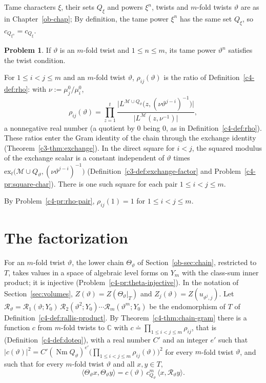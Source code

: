 \documentclass[reqno]{amsart}
\newcounter{chap}
\theoremstyle{definition}
\newtheorem{problem}{Problem}[section]
\theoremstyle{plain}
\newcommand{\C}{\mathbb C}
\newcommand{\Nm}{\operatorname{Nm}}
\newcommand{\Rc}{\mathcal R}
\begin{document}
Tame characters \(\xi\), their sets \(Q_\xi\) and powers \(\xi^n\), twists and \(m\)-fold twists \(\vartheta\) are as in Chapter~\ref{ob-chap}; By definition, the tame power \(\xi^n\) has the same set \(Q_\xi\), so \(c_{Q_{\xi^n}} = c_{Q_\xi}\).

\begin{problem}\label{pr:powers}
If \(\vartheta\) is an \(m\)-fold twist and \(1 \le n \le m\), its tame power \(\vartheta^n\) satisfies the twist condition.
\end{problem}

For \(1 \le i < j \le m\) and an \(m\)-fold twist \(\vartheta\), \(\rho_{ij}(\vartheta)\) is the ratio of Definition~\ref{c4-def:rho}: with \(\nu := \mu_j^0/\mu_i^0\),
\[
  \rho_{ij}(\vartheta) = \prod_{z=1}^{t} \frac{\lvert L^{\mathcal M \cup Q_\vartheta}\bigl(z, (\nu\vartheta^{j-i})^{-1}\bigr)\rvert}{\lvert L^{\mathcal M}(z, \nu^{-1})\rvert} ,
\]
a nonnegative real number (a quotient by \(0\) being \(0\), as in Definition~\ref{c4-def:rho}).  These ratios enter the Gram identity of the chain through the exchange identity (Theorem~\ref{c3-thm:exchange}).  In the direct square for \(i < j\), the squared modulus of the exchange scalar is a constant independent of \(\vartheta\) times \(\mathrm{ex}_t\bigl(\mathcal M \cup Q_\vartheta, (\nu\vartheta^{j-i})^{-1}\bigr)\) (Definition~\ref{c3-def:exchange-factor} and Problem~\ref{c4-pr:square-char}).  There is one such square for each pair \(1 \le i < j \le m\).

By Problem~\ref{c4-pr:rho-pair}, \(\rho_{ij}(1) = 1\) for \(1 \le i < j \le m\).

\section{The factorization}\label{sec:factor}

For an \(m\)-fold twist \(\vartheta\), the lower chain \(\Theta_\vartheta\) of Section~\ref{ob-sec:chain}, restricted to \(T\), takes values in a space of algebraic level forms on \(Y_m\) with the class-sum inner product; it is injective (Problem~\ref{c4-pr:theta-injective}).  In the notation of Section~\ref{sec:volumes}, \(Z(\vartheta) = Z(\Theta_\vartheta|_T)\) and \(Z_j(\vartheta) = Z(u_{\vartheta^j, j})\).  Let \(\Rc_\vartheta = \Rc_1(\vartheta; Y_0)\,\Rc_2(\vartheta^2; Y_0) \cdots \Rc_m(\vartheta^m; Y_0)\) be the endomorphism of \(T\) of Definition~\ref{c4-def:rallis-product}.  By Theorem~\ref{c4-thm:chain-gram} there is a function \(c\) from \(m\)-fold twists to \(\C\) with \(c \doteq \prod_{1 \le i < j \le m}\rho_{ij}\), that is (Definition~\ref{c4-def:doteq}), with a real number \(C'\) and an integer \(e'\) such that \(\lvert c(\vartheta)\rvert^2 = C'(\Nm Q_\vartheta)^{e'}\bigl(\prod_{1 \le i < j \le m}\rho_{ij}(\vartheta)\bigr)^2\) for every \(m\)-fold twist \(\vartheta\), and such that for every \(m\)-fold twist \(\vartheta\) and all \(x, y \in T\),
\[
  \langle \Theta_\vartheta x, \Theta_\vartheta y\rangle = c(\vartheta)\,c_{Q_\vartheta}^m\,\langle x, \Rc_\vartheta y\rangle .
\]
\end{document}
